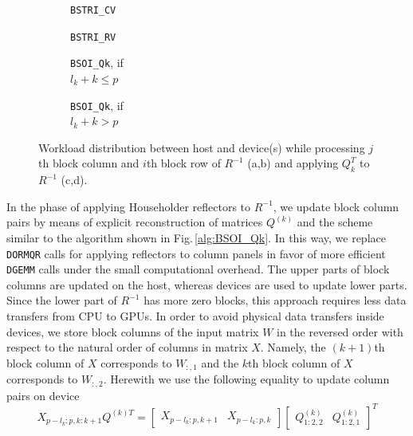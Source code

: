 \documentclass{llncs}
\begin{document}
\begin{figure}[t]
  \centering
  \begin{subfigure}[t]{0.2\linewidth}
    \scalebox{0.59}{}
    \caption{{\tt BSTRI\_CV} \label{fig:BSTRI_CV_HostDevice_workload}}
  \end{subfigure}
  \begin{subfigure}[t]{0.4\linewidth}
    \scalebox{0.59}{}
    \caption{{\tt BSTRI\_RV}\label{fig:BSTRI_RV_HostDevice_workload}}
  \end{subfigure}
  \begin{subfigure}[t]{0.17\linewidth}
    \scalebox{0.59}{}
    \caption{{\tt BSOI\_Qk}, if \\$l_k + k \leq p$ \label{fig:BSOI_Qk_HostDevice_workload1}}
  \end{subfigure}
  \begin{subfigure}[t]{0.17\linewidth}
    \scalebox{0.59}{}
    \caption{{\tt BSOI\_Qk}, if \\$l_k + k > p$ \label{fig:BSOI_Qk_HostDevice_workload2}}
  \end{subfigure}

  \caption[]{Workload distribution between host and device(s) 
    while processing 
    $j$th block column and $i$th block row of $R^{-1}$ (a,b) 
    and applying $Q_k^T$ to $R^{-1}$ (c,d).\footnotemark}
  \label{fig:HostDevice_workload}
\end{figure}

In the phase of applying Householder reflectors to $R^{-1}$,
we update block column pairs by means of 
explicit reconstruction of matrices $Q^{(k)}$
and the scheme similar to the algorithm shown in Fig.\,\ref{alg:BSOI_Qk}.
In this way, 
we replace {\tt DORMQR} calls for applying reflectors to column panels 
in favor of more efficient {\tt DGEMM} calls
under the small computational overhead.
The upper parts of block columns are updated on the host, 
whereas devices are used to update lower parts. 
Since the lower part of $R^{-1}$ has more zero blocks,
this approach requires less data transfers from CPU to GPUs.
In order to avoid physical data transfers inside devices,
we store block columns of the input matrix $W$ in the reversed order 
with respect to the natural order of columns in matrix $X$. 
Namely, the $(k+1)$th block column of $X$ 
corresponds to ${W}_{:,1}$ and 
the $k$th block column of $X$ 
corresponds to ${W}_{:,2}$.
Herewith we use the following equality to update column pairs on device 
\begin{equation}
  \label{BSOI_device_update}
    X_{p-l_k:p,k:k+1}   Q^{{(k)}T} = 
    \begin{bmatrix}
      X_{p-l_k:p,k+1} & X_{p-l_k:p,k}
    \end{bmatrix} 
    \begin{bmatrix}
      Q^{(k)}_{1:2,2} & Q^{(k)}_{1:2,1}
    \end{bmatrix}^T  
\end{equation}
\end{document}
